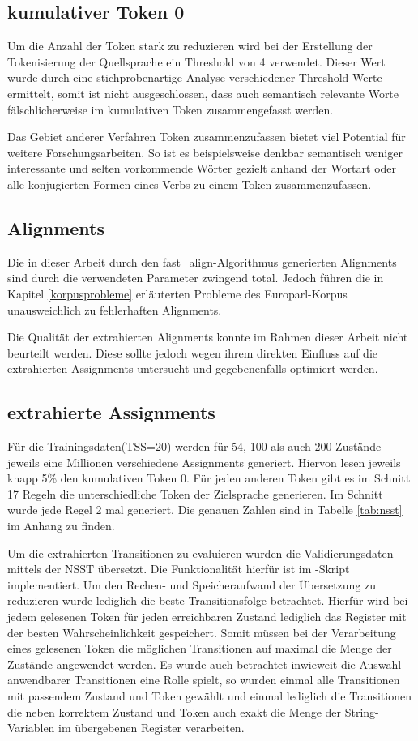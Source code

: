 \documentclass[conference]{IEEEtran}
\begin{document}
\subsection{kumulativer Token 0}
Um die Anzahl der Token stark zu reduzieren wird bei der Erstellung der Tokenisierung der Quellsprache ein Threshold von 4 verwendet.
Dieser Wert wurde durch eine stichprobenartige Analyse verschiedener Threshold-Werte ermittelt, somit ist nicht ausgeschlossen, dass auch semantisch relevante Worte fälschlicherweise im kumulativen Token zusammengefasst werden.

Das Gebiet anderer Verfahren Token zusammenzufassen bietet viel Potential für weitere Forschungsarbeiten. 
So ist es beispielsweise denkbar semantisch weniger interessante und selten vorkommende Wörter gezielt anhand der Wortart oder alle konjugierten Formen eines Verbs zu einem Token zusammenzufassen.

\subsection{Alignments}
Die in dieser Arbeit durch den fast\_align-Algorithmus generierten Alignments sind durch die verwendeten Parameter zwingend total.
Jedoch führen die in Kapitel \ref{korpusprobleme} erläuterten Probleme des Europarl-Korpus unausweichlich zu fehlerhaften Alignments.

Die Qualität der extrahierten Alignments konnte im Rahmen dieser Arbeit nicht beurteilt werden.
Diese sollte jedoch wegen ihrem direkten Einfluss auf die extrahierten Assignments untersucht und gegebenenfalls optimiert werden. 

\subsection{extrahierte Assignments}
Für die Trainingsdaten(TSS=20) werden für 54, 100 als auch 200 Zustände jeweils eine Millionen verschiedene Assignments generiert. 
Hiervon lesen jeweils knapp 5\% den kumulativen Token 0.
Für jeden anderen Token gibt es im Schnitt 17 Regeln die unterschiedliche Token der Zielsprache generieren.
Im Schnitt wurde jede Regel 2 mal generiert.
Die genauen Zahlen sind in Tabelle \ref{tab:nsst} im Anhang zu finden.

Um die extrahierten Transitionen zu evaluieren wurden die Validierungsdaten mittels der NSST übersetzt.
Die Funktionalität hierfür ist im -Skript implementiert.
Um den Rechen- und Speicheraufwand der Übersetzung zu reduzieren wurde lediglich die beste Transitionsfolge betrachtet.
Hierfür wird bei jedem gelesenen Token für jeden erreichbaren Zustand lediglich das Register mit der besten Wahrscheinlichkeit gespeichert.
Somit müssen bei der Verarbeitung eines gelesenen Token die möglichen Transitionen auf maximal die Menge der Zustände angewendet werden.
Es wurde auch betrachtet inwieweit die Auswahl anwendbarer Transitionen eine Rolle spielt, so wurden einmal alle Transitionen mit passendem Zustand und Token gewählt und einmal lediglich die Transitionen die neben korrektem Zustand und Token auch exakt die Menge der String-Variablen im übergebenen Register verarbeiten.
\end{document}
